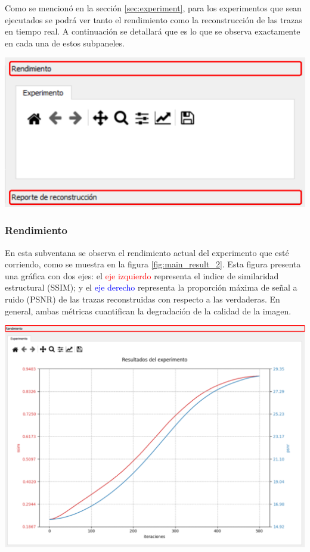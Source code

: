 \documentclass[12pt,twoside,letter]{ol-softwaremanual}
\newenvironment{Figure}
  {\par\medskip\noindent\minipage{\linewidth}}
  {\endminipage\par\medskip}
\begin{document}
\begin{multicols}{2}

Como se mencionó en la sección \ref{sec:experiment}, para los experimentos que sean ejecutados se podrá ver tanto el rendimiento como la reconstrucción de las trazas en tiempo real. A continuación se detallará que es lo que se observa exactamente en cada una de estos subpaneles.

\begin{Figure}
    \centering
    \includegraphics[width=0.7\linewidth]{main-result-1.png}
    \label{fig:main_result_1}
\end{Figure}

\end{multicols}

\subsubsection*{Rendimiento}

En esta subventana se observa el rendimiento actual del experimento que esté corriendo, como se muestra en la figura \ref{fig:main_result_2}. Esta figura presenta una gráfica con dos ejes: el \textcolor{red}{eje izquierdo} representa el indice de similaridad estructural (SSIM); y el \textcolor{blue}{eje derecho} representa la proporción máxima de señal a ruido (PSNR) de las trazas reconstruidas con respecto a las verdaderas. En general, ambas métricas cuantifican la degradación de la calidad de la imagen.

\begin{Figure}
	\centering
	\includegraphics[width=0.8\linewidth]{main-result-2.png}
	\label{fig:main_result_2}
\end{Figure}
\end{document}
